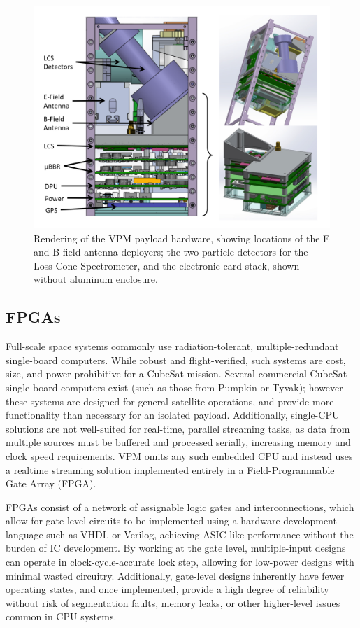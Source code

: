 \begin{figure}[t]
\begin{center}
\includegraphics[width=32pc]{figures/vpm_figures/payload_figure.png}
\caption[VPM payload hardware instrument arrangement]{Rendering of the VPM payload hardware, showing locations of the E and B-field antenna deployers; the two particle detectors for the Loss-Cone Spectrometer, and the electronic card stack, shown without aluminum enclosure.}
\label{fig:hardware_stack}
\end{center}
\end{figure}


\subsection{FPGAs}
Full-scale space systems commonly use radiation-tolerant, multiple-redundant single-board computers. While robust and flight-verified, such systems are cost, size, and power-prohibitive for a CubeSat mission. Several commercial CubeSat single-board computers exist (such as those from Pumpkin or Tyvak); however these systems are designed for general satellite operations, and provide more functionality than necessary for an isolated payload. Additionally, single-CPU solutions are not well-suited for real-time, parallel streaming tasks, as data from multiple sources must be buffered and processed serially, increasing memory and clock speed requirements. VPM omits any such embedded CPU and instead uses a realtime streaming solution implemented entirely in a Field-Programmable Gate Array (FPGA). 

FPGAs consist of a network of assignable logic gates and interconnections, which allow for gate-level circuits to be implemented using a hardware development language such as VHDL or Verilog, achieving ASIC-like performance without the burden of IC development. By working at the gate level, multiple-input designs can operate in clock-cycle-accurate lock step, allowing for low-power designs with minimal wasted circuitry. Additionally, gate-level designs inherently have fewer operating states, and once implemented, provide a high degree of reliability without risk of segmentation faults, memory leaks, or other higher-level issues common in CPU systems.

